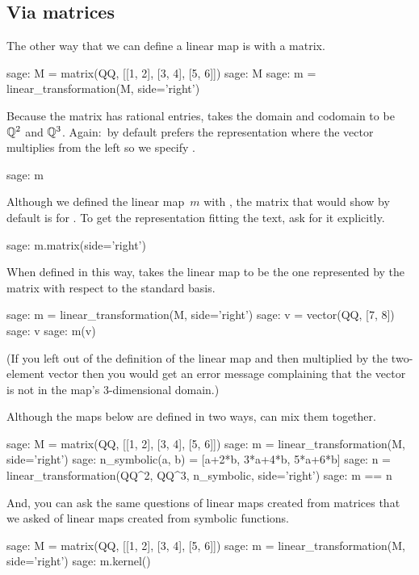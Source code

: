 \subsection{Via matrices}
The other way that we can define a linear map is with
a matrix.
\begin{sagecommandline}
sage: M = matrix(QQ, [[1, 2], [3, 4], [5, 6]])
sage: M
sage: m = linear_transformation(M, side='right')
\end{sagecommandline}
Because the matrix has rational entries, \Sage{} takes the
domain and codomain to be $\mathbb{Q}^2$ and $\mathbb{Q}^3$.
Again:~by default \Sage{} prefers the 
representation where the vector multiplies
from the left so we specify .
\begin{sagecommandline}
sage: m 
\end{sagecommandline}
Although we defined the linear map~$m$ with
\mbox{,} 
the matrix that \Sage{} would show by default is for 
.
To get the representation fitting the text, ask for it explicitly.
\begin{sagecommandline}
sage: m.matrix(side='right')
\end{sagecommandline}

When defined in this way, \Sage{} takes the linear map to be the one
represented by the matrix with respect to the standard basis.
\begin{sagecommandline}
sage: m = linear_transformation(M, side='right')
sage: v = vector(QQ, [7, 8])
sage: v
sage: m(v)  
\end{sagecommandline}
(If you left  out of the definition of the
linear map and then multiplied 
by the two-element vector then you would get an error message
complaining that the vector is not in the map's 
$3$-dimensional domain.)

Although the maps below are defined in two ways, 
\Sage{} can mix them together.
\begin{sagecommandline}
sage: M = matrix(QQ, [[1, 2], [3, 4], [5, 6]])
sage: m = linear_transformation(M, side='right')
sage: n_symbolic(a, b) = [a+2*b, 3*a+4*b, 5*a+6*b]
sage: n = linear_transformation(QQ^2, QQ^3, n_symbolic, side='right')
sage: m == n  
\end{sagecommandline}
And, you can ask the same questions of linear maps created from
matrices that we asked of linear maps created from symbolic functions.
\begin{sagecommandline}
sage: M = matrix(QQ, [[1, 2], [3, 4], [5, 6]])
sage: m = linear_transformation(M, side='right')
sage: m.kernel() 
\end{sagecommandline}


